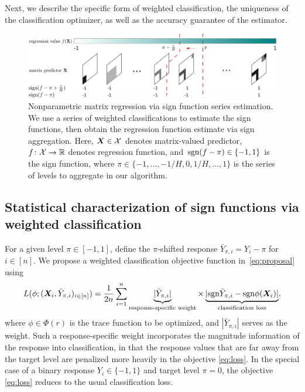 \documentclass[aos]{imsart}
\theoremstyle{definition}
\newcommand*{\KeepStyleUnderBrace}[1]{%
\mathop{%
\mathchoice
{\underbrace{\displaystyle#1}}%
{\underbrace{\textstyle#1}}%
{\underbrace{\scriptstyle#1}}%
{\underbrace{\scriptscriptstyle#1}}%
}\limits
}
\def\sign{\textup{sgn}}
\begin{document}
Next, we describe the specific form of weighted classification, the uniqueness of the classification optimizer, as well as the accuracy guarantee of the estimator. 

\begin{figure}[b!]
\includegraphics[width=\textwidth]{figure/demo_method.pdf}
\caption{Nonparametric matrix regression via sign function series estimation. We use a series of weighted classifications to estimate the sign functions, then obtain the regression function estimate via sign aggregation. Here, $\bm X\in\mathcal{X}$ denotes matrix-valued predictor, $f\colon \mathcal{X}\to \mathbb{R}$ denotes regression function, and $\sign(f-\pi)\in\{-1,1\}$ is the sign function, where $\pi\in\{-1,\ldots,-1/H,0,1/H,\ldots, 1\}$ is the series of levels to aggregate in our algorithm.}
\label{fig:method}
\end{figure}



\subsection{Statistical characterization of sign functions via weighted classification}

For a given level $\pi\in[-1,1]$, define the $\pi$-shifted response $\bar Y_{\pi,i} =Y_i-\pi$ for $i\in[n]$. We propose a weighted classification objective function in~\eqref{eq:proposal} using 
\begin{equation}\label{eq:loss}
L(\phi;(\mX_i,\bar Y_{\pi,i})_{i\in[n]})={1\over 2n}\sum_{i=1}^n\KeepStyleUnderBrace{|\bar Y_{\pi,i}|}_{\text{response-specific weight}}\times\KeepStyleUnderBrace{|\sign \bar Y_{\pi,i} - \sign \phi(\mX_i)|}_{\text{classification loss}},
\end{equation}
where $\phi\in \Phi(r)$ is the trace function to be optimized, and $|\bar Y_{\pi, i}|$ serves as the weight. Such a response-specific weight incorporates the magnitude information of the response into classification, in that the response values that are far away from the target level are penalized more heavily in the objective \eqref{eq:loss}. In the special case of a binary response $Y_i\in\{-1,1\}$ and target level $\pi=0$, the objective \eqref{eq:loss} reduces to the usual classification loss. 
\end{document}
